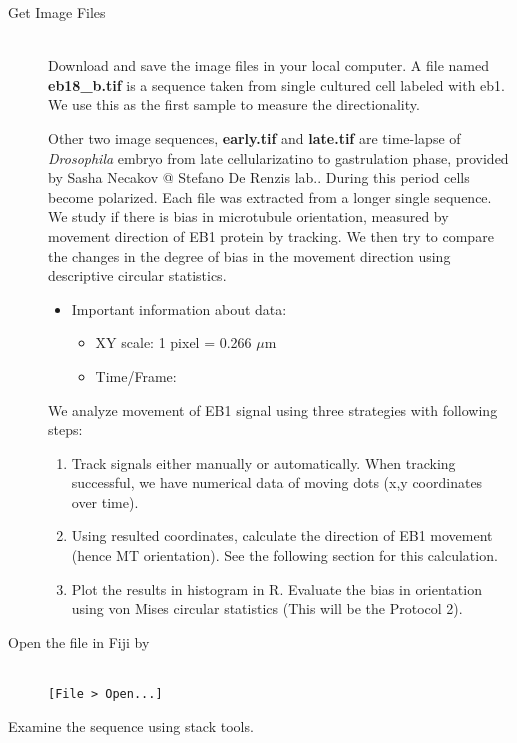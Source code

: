 \documentclass[11pnt]{article}
\begin{document}
\begin{description}
\item[Get Image Files]\hfill\\

Download and save the image files in your local computer. A file named \textbf{eb18\_b.tif} is a sequence taken from single cultured cell labeled with eb1. We use this as the first sample to measure the directionality. 

Other two image sequences, \textbf{early.tif} and \textbf{late.tif} are time-lapse of \textit{Drosophila} embryo from late cellularizatino to gastrulation phase, provided by Sasha Necakov @ Stefano De Renzis lab.. During this period cells become polarized. Each file was extracted from a longer single sequence.  We study if there is bias in microtubule orientation, measured by movement direction of EB1 protein by tracking. We then try to compare the changes in the degree of bias in the movement direction using descriptive circular statistics. 

\begin{itemize}
\item Important information about data:
\begin{itemize}
\item XY scale: 1 pixel = 0.266 $\mu$m
\item Time/Frame: 
\end{itemize}
\end{itemize}
We analyze movement of EB1 signal using three strategies with following steps: 
\begin{enumerate}
\item Track signals either manually or automatically. When tracking successful, we have numerical data of moving dots (x,y coordinates over time). 
\item Using resulted coordinates, calculate the direction of EB1 movement (hence MT orientation). See the following section for this calculation. 
\item Plot the results in histogram in R. Evaluate the bias in orientation using von Mises circular statistics (This will be the Protocol 2). 
\end{enumerate}


\item[Open the file in Fiji by]\hfill\\

\verb"[File > Open...]"\\

\item[Examine the sequence using stack tools.]\hfill\\


\end{description}
\end{document}

